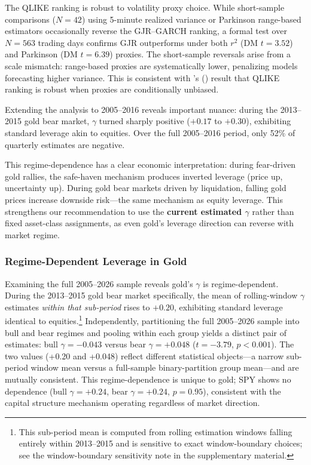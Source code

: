 The QLIKE ranking is robust to volatility proxy choice. While short-sample comparisons ($N = 42$) using 5-minute realized variance or Parkinson range-based estimators occasionally reverse the GJR--GARCH ranking, a formal test over $N = 563$ trading days confirms GJR outperforms under both $r^2$ (DM $t = 3.52$) and Parkinson (DM $t = 6.39$) proxies. The short-sample reversals arise from a scale mismatch: range-based proxies are systematically lower, penalizing models forecasting higher variance. This is consistent with \citeauthor{patton2011}'s (\citeyear{patton2011}) result that QLIKE ranking is robust when proxies are conditionally unbiased.

Extending the analysis to 2005--2016 reveals important nuance: during the 2013--2015 gold bear market, $\gamma$ turned sharply positive ($+0.17$ to $+0.30$), exhibiting standard leverage akin to equities. Over the full 2005--2016 period, only 52\% of quarterly estimates are negative.

This regime-dependence has a clear economic interpretation: during fear-driven gold rallies, the safe-haven mechanism produces inverted leverage (price up, uncertainty up). During gold bear markets driven by liquidation, falling gold prices increase downside risk---the same mechanism as equity leverage. This strengthens our recommendation to use the \textbf{current estimated $\gamma$} rather than fixed asset-class assignments, as even gold's leverage direction can reverse with market regime.


\subsubsection{Regime-Dependent Leverage in Gold}

Examining the full 2005--2026 sample reveals gold's $\gamma$ is regime-dependent. During the 2013--2015 gold bear market specifically, the mean of rolling-window $\gamma$ estimates \emph{within that sub-period} rises to $+0.20$, exhibiting standard leverage identical to equities.\footnote{This sub-period mean is computed from rolling estimation windows falling entirely within 2013--2015 and is sensitive to exact window-boundary choices; see the window-boundary sensitivity note in the supplementary material.} Independently, partitioning the full 2005--2026 sample into bull and bear regimes and pooling within each group yields a distinct pair of estimates: bull $\gamma = -0.043$ versus bear $\gamma = +0.048$ ($t = -3.79$, $p < 0.001$). The two values (+0.20 and +0.048) reflect different statistical objects---a narrow sub-period window mean versus a full-sample binary-partition group mean---and are mutually consistent. This regime-dependence is unique to gold; SPY shows no dependence (bull $\gamma = +0.24$, bear $\gamma = +0.24$, $p = 0.95$), consistent with the capital structure mechanism operating regardless of market direction.

